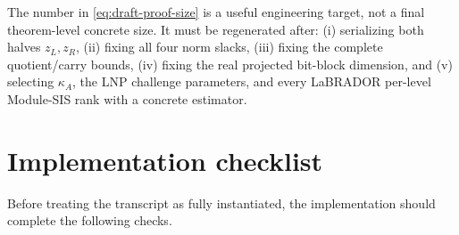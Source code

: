\documentclass[11pt,a4paper]{article}
\begin{document}
\begin{importantbox}
The number in \cref{eq:draft-proof-size} is a useful engineering target, not a
final theorem-level concrete size.  It must be regenerated after:
(i) serializing both halves \(z_L,z_R\),
(ii) fixing all four norm slacks,
(iii) fixing the complete quotient/carry bounds,
(iv) fixing the real projected bit-block dimension, and
(v) selecting \(\kappa_A\), the LNP challenge parameters, and every
LaBRADOR per-level Module-SIS rank with a concrete estimator.
\end{importantbox}

\section{Implementation checklist}

Before treating the transcript as fully instantiated, the implementation should
complete the following checks.
\end{document}
